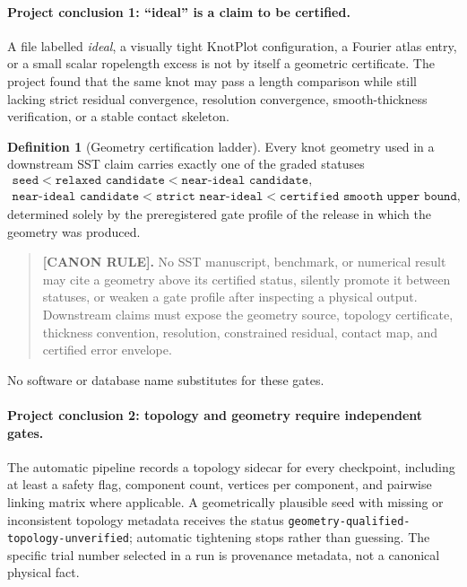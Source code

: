 \documentclass[11pt]{article}
\theoremstyle{definition}
\newtheorem{definition}{Definition}[section]
\theoremstyle{plain}
\theoremstyle{remark}
\begin{document}
\paragraph{Project conclusion 1: ``ideal'' is a claim to be certified.}
A file labelled \emph{ideal}, a visually tight KnotPlot configuration, a
Fourier atlas entry, or a small scalar ropelength excess is not by itself a
geometric certificate.  The project found that the same knot may pass a length
comparison while still lacking strict residual convergence, resolution
convergence, smooth-thickness verification, or a stable contact skeleton.

\begin{definition}[Geometry certification ladder]
\label{def:geometry_certification_ladder}
Every knot geometry used in a downstream SST claim carries exactly one of the
graded statuses
\begin{equation}
    \begin{gathered}
        \texttt{seed}<\texttt{relaxed candidate}<\texttt{near-ideal candidate},\\
        \texttt{near-ideal candidate}<\texttt{strict near-ideal}
        <\texttt{certified smooth upper bound},
    \end{gathered}
    \label{eq:genesis_knotplot_status_ladder}
\end{equation}
determined solely by the preregistered gate profile of the release in which the
geometry was produced.
\end{definition}

\begin{quote}
\textbf{[CANON RULE].}
No SST manuscript, benchmark, or numerical result may cite a geometry above its
certified status, silently promote it between statuses, or weaken a gate profile
after inspecting a physical output.  Downstream claims must expose the geometry
source, topology certificate, thickness convention, resolution, constrained
residual, contact map, and certified error envelope.
\end{quote}
No software or database name substitutes for these gates.

\paragraph{Project conclusion 2: topology and geometry require independent gates.}
The automatic pipeline records a topology sidecar for every checkpoint,
including at least a safety flag, component count, vertices per component, and
pairwise linking matrix where applicable.  A geometrically plausible seed with
missing or inconsistent topology metadata receives the status
\texttt{geometry-qualified-topology-unverified}; automatic tightening stops
rather than guessing.  The specific trial number selected in a run is
provenance metadata, not a canonical physical fact.
\end{document}
